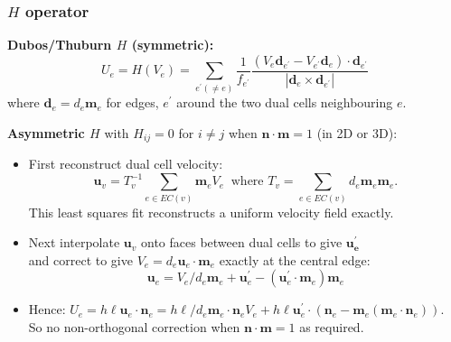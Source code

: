 \begin{frame}
\frametitle{$H$ operator}

\textbf{Dubos/Thuburn $H$ (symmetric):}
\[
U_{e}=H(V_{e})=\sum_{e^{\prime}\left(\ne e\right)}\frac{1}{f_{e^{\prime}}}\frac{\left(V_{e}\mathbf{d}_{e^{\prime}}-V_{e^{\prime}}\mathbf{d}_{e}\right)\cdot\mathbf{d}_{e^{\prime}}}{|\mathbf{d}_{e}\times\mathbf{d}_{e^{\prime}}|}
\]
{\small where $\mathbf{d}_{e}=d_{e}\mathbf{m}_{e}$ for edges, $e^{\prime}$
around the two dual cells neighbouring $e$.}


\pause
\textbf{Asymmetric $H$ }with $H_{ij}=0$ for $i\ne j$ when $\mathbf{n}\cdot\mathbf{m}=1$
(in 2D or 3D):
\begin{itemize}[<+->]
\item First reconstruct dual cell velocity:
\[
\mathbf{u}_{v}=T_{v}^{-1}\sum_{e\in EC(v)}\mathbf{m}_{e}V_{e}\ \text{ where }T_{v}=\sum_{e\in EC(v)}d_{e}\mathbf{m}_{e}\mathbf{m}_{e}.
\]
This least squares fit reconstructs a uniform velocity field exactly. 
\item Next interpolate $\mathbf{u}_{v}$ onto faces between dual cells to
give $\mathbf{u_{e}^{\prime}}$\\
and correct to give $V_{e}=d_{e}\mathbf{u}_{e}\cdot\mathbf{m}_{e}$
exactly at the central edge:
\[
\mathbf{\mathbf{u}}_{e}=V_{e}/d_{e}\mathbf{m}_{e}+\mathbf{u}_{e}^{\prime}-\left(\mathbf{u}_{e}^{\prime}\cdot\mathbf{m}_{e}\right)\mathbf{m}_{e}
\]

\item 
Hence: $U_{e}  =h\ell\mathbf{u}_{e}\cdot\mathbf{n}_{e}
 =h\ell/d_{e}\mathbf{m}_{e}\cdot\mathbf{n}_{e}V_{e}+h\ell\mathbf{u}_{e}^{\prime}\cdot\left(\mathbf{n}_{e}-\mathbf{m}_{e}\left(\mathbf{m}_{e}\cdot\mathbf{n}_{e}\right)\right)$.\\
So  no non-orthogonal correction when $\mathbf{n}\cdot\mathbf{m}=1$
as required.
\end{itemize}

\end{frame}
